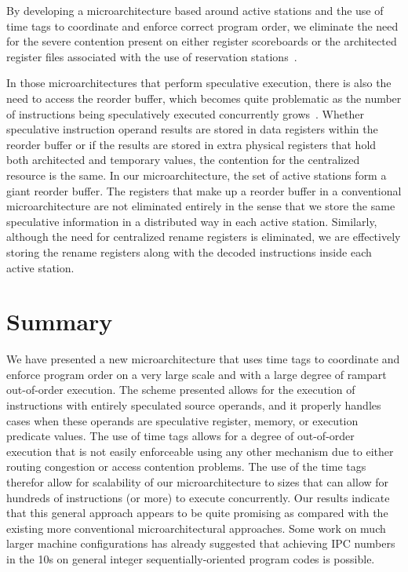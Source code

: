 \documentclass[10pt,dvips]{article}
\begin{document}
By developing a microarchitecture based around active stations
and the use of time tags to coordinate and enforce correct program
order, we eliminate the need for the severe contention present 
on either register scoreboards \cite{Thornton64} 
or the architected register files associated
with the use of reservation stations~\cite{Anderson67}.  

In those microarchitectures
that perform speculative execution, there is also
the need to access the reorder buffer, which becomes quite problematic
as the number of instructions being speculatively executed concurrently
grows~\cite{Palacharla}.  Whether speculative instruction operand
results are stored in data registers within the reorder buffer or if the
results are stored in extra physical registers that hold both architected
and temporary values, the contention for the centralized resource is
the same.  In our microarchitecture, the set of active
stations form a giant reorder buffer.  The registers that
make up a reorder buffer in a conventional microarchitecture are
not eliminated entirely in the sense that we store the same speculative
information in a distributed way in each active station.  Similarly,
although the need for centralized rename registers is eliminated,
we are effectively storing the rename registers along with the
decoded instructions inside each active station.  
%
%
\section{Summary}
%
We have presented a new microarchitecture
that uses time tags to coordinate and enforce
program order on a very large scale and with a large degree
of rampart out-of-order execution.
The scheme presented allows for the execution of instructions
with entirely speculated source operands, and it properly
handles cases when these operands are speculative register,
memory, or execution predicate values.
The use of time tags allows for a degree of out-of-order
execution that is not easily enforceable using any other
mechanism due to either routing congestion or access contention
problems.
The use of the time tags therefor allow for scalability of our 
microarchitecture
to sizes that can allow for hundreds of instructions (or more) to execute
concurrently.
Our results indicate that this general approach appears to be quite
promising as compared with the existing more conventional microarchitectural
approaches.  
Some work on much larger machine configurations has already
suggested that achieving IPC numbers in the 10s on general integer
sequentially-oriented program codes is possible.
%


%
\end{document}

